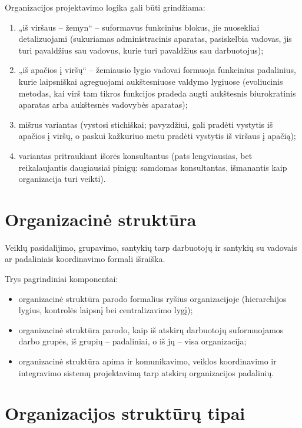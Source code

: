 Organizacijos projektavimo logika gali būti grindžiama:
\begin{enumerate}
  \item „iš viršaus – žemyn“ – suformavus funkcinius blokus, jie
    nuosekliai detalizuojami (sukuriamas administracinis aparatas,
    pasiskelbia vadovas, jis turi pavaldžius sau vadovus, kurie
    turi pavaldžius sau darbuotojus);
  \item „iš apačios į viršų“ – žemiausio lygio vadovai formuoja
    funkcinius padalinius, kurie laipsniškai agreguojami aukštesniuose
    valdymo lygiuose (evoliucinis metodas, kai virš tam tikros funkcijos
    pradeda augti aukštesnis biurokratinis aparatas arba aukštesnės
    vadovybės aparatas);
  \item mišrus variantas (vystosi stichiškai; pavyzdžiui, gali pradėti
    vystytis iš apačios į viršų, o paskui kažkuriuo metu pradėti vystytis
    iš viršaus į apačią);
  \item variantas pritraukiant išorės konsultantus (pats lengviausias,
    bet reikalaujantis daugiausiai pinigų: samdomas konsultantas, 
    išmanantis kaip organizacija turi veikti).
\end{enumerate}

\section{Organizacinė struktūra}

\begin{defn}
  Veiklų pasidalijimo, grupavimo, santykių tarp darbuotojų ir santykių
  su vadovais ar padaliniais koordinavimo formali išraiška.
\end{defn}

Trys pagrindiniai komponentai:
\begin{itemize}
  \item organizacinė struktūra parodo formalius ryšius organizacijoje
    (hierarchijos lygius, kontrolės laipsnį bei centralizavimo lygį);
  \item organizacinė struktūra parodo, kaip iš atskirų darbuotojų
    suformuojamos darbo grupės, iš grupių – padaliniai, o iš jų –
    visa organizacija;
  \item organizacinė struktūra apima ir komunikavimo, veiklos
    koordinavimo ir integravimo sistemų projektavimą tarp atskirų
    organizacijos padalinių.
\end{itemize}

\section{Organizacijos struktūrų tipai}

